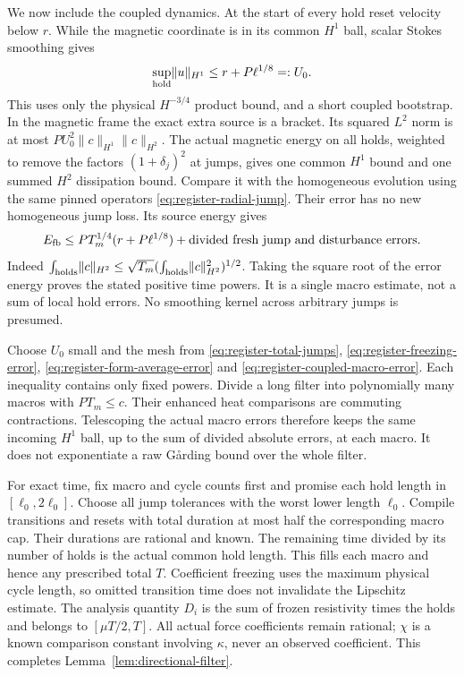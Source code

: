 \documentclass[11pt,a4paper]{amsart}
\theoremstyle{definition}
\theoremstyle{remark}
\numberwithin{equation}{section}
\newcommand{\norm}[1]{\lVert #1\rVert}
\begin{document}
We now include the coupled dynamics.  At the start of every hold reset
velocity below $r$.  While the magnetic coordinate is in its common
$H^1$ ball, scalar Stokes smoothing gives
\begin{equation}\label{eq:register-small-hold-velocity}
 \sup_{\rm hold}\norm u_{H^1}\le r+P\ell^{1/8}=:U_0.
\end{equation}
This uses only the physical $H^{-3/4}$ product bound, and a short coupled
bootstrap.  In the magnetic frame the exact extra source is a bracket.
Its squared $L^2$ norm is at most
$PU_0^2\norm c_{H^1}\norm c_{H^2}$.
The actual magnetic energy on all holds, weighted to remove the factors
$(1+\delta_j)^2$ at jumps, gives one common $H^1$ bound and one summed
$H^2$ dissipation bound.  Compare it with the homogeneous evolution
using the same pinned operators \eqref{eq:register-radial-jump}.
Their error has no new homogeneous jump loss.  Its source energy gives
\begin{equation}\label{eq:register-coupled-macro-error}
 E_{\rm fb}\le PT_m^{1/4}(r+P\ell^{1/8})
                +\text{divided fresh jump and disturbance errors}.
\end{equation}
Indeed $\int_{\rm holds}\norm c_{H^2}
\le\sqrt{T_m}(\int_{\rm holds}\norm c_{H^2}^2)^{1/2}$.
Taking the square root of the error energy proves the stated positive
time powers.  It is a single macro estimate, not a sum of local hold
errors.  No smoothing kernel across arbitrary jumps is presumed.

Choose $U_0$ small and the mesh from
\eqref{eq:register-total-jumps}, \eqref{eq:register-freezing-error},
\eqref{eq:register-form-average-error} and
\eqref{eq:register-coupled-macro-error}.  Each inequality contains only
fixed powers.  Divide a long filter into polynomially many macros with
$PT_m\le c$.  Their enhanced heat comparisons are commuting contractions.
Telescoping the actual macro errors therefore keeps the same incoming
$H^1$ ball, up to the sum of divided absolute errors, at each macro.
It does not exponentiate a raw G\aa rding bound over the whole filter.

For exact time, fix macro and cycle counts first and promise each hold
length in $[\ell_0,2\ell_0]$.  Choose all jump tolerances with the worst lower
length $\ell_0$.  Compile transitions and resets with total duration at most
half the corresponding macro cap.  Their durations are rational and known.
The remaining time divided by its number of holds is the actual common
hold length.  This fills each macro and hence any prescribed total $T$.
Coefficient freezing uses the maximum physical cycle length, so omitted
transition time does not invalidate the Lipschitz estimate.  The analysis
quantity $D_i$ is the sum of frozen resistivity times the holds and belongs
to $[\mu T/2,T]$.  All actual force coefficients remain rational; $\chi$
is a known comparison constant involving $\kappa$, never an observed
coefficient.  This completes Lemma~\ref{lem:directional-filter}.
\end{document}
